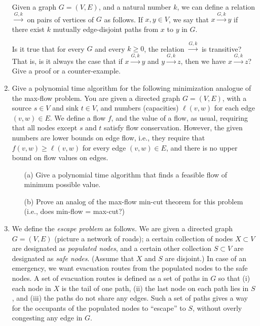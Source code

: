 \documentclass[12pt]{article}
\begin{document}
\begin{enumerate}
\def\lnk{{\stackrel{G,k}{\longrightarrow}}}

Given a graph $G = (V,E)$, and a natural number $k$,
we can define a relation $\lnk$ on pairs of vertices of $G$ as follows.
If $x, y \in V$, we say that $x \lnk y$ if there
exist $k$ mutually edge-disjoint paths from $x$ to $y$ in $G$.

Is it true that for every $G$ and every $k \geq 0$,
the relation $\lnk$ is transitive?
That is, is it always the case that if $x \lnk y$ and $y \lnk z$,
then we have $x \lnk z$?
Give a proof or a counter-example.



\item 

Give a polynomial time algorithm for the following minimization analogue
of the max-flow problem. 
You are given a directed graph $G=(V,E)$, with a source $s \in V$ 
and sink $t \in V$, and numbers (capacities) $\ell(v,w)$ for each edge 
$(v,w) \in E$. 
We define a flow $f$, and the value of a flow, as usual, requiring 
that all nodes except $s$ and $t$ satisfy flow conservation. 
However, the given numbers are lower bounds on edge flow, 
i.e., they require that $f(v,w) \ge \ell(v,w)$ for every edge $(v,w) \in E$, 
and there is no upper bound on flow values on edges.
\begin{itemize}
\item[(a)] Give a polynomial time algorithm that finds 
a feasible flow of minimum possible value.
\item[(b)] Prove an analog of the max-flow min-cut theorem for this problem 
(i.e., does min-flow = max-cut?)
\end{itemize}






\item 

We define the {\em escape problem} as
follows.  We are given a directed graph $G = (V,E)$ (picture a
network of roads); a certain collection of nodes $X \subset V$
are designated as {\em populated nodes}, and a certain
other collection $S \subset V$ are designated as {\em safe nodes}.
(Assume that $X$ and $S$ are disjoint.)
In case of an emergency, we want evacuation routes
from the populated nodes to the safe nodes.
A set of evacuation routes is defined as a set
of paths in $G$ so that (i) each node in $X$ is the
tail of one path, (ii) the last node on each path lies in $S$, and
(iii) the paths do not share any edges.
Such a set of paths gives a way for the
occupants of the populated nodes to ``escape'' to $S$,
without overly congesting any edge in $G$.


\end{enumerate}
\end{document}
